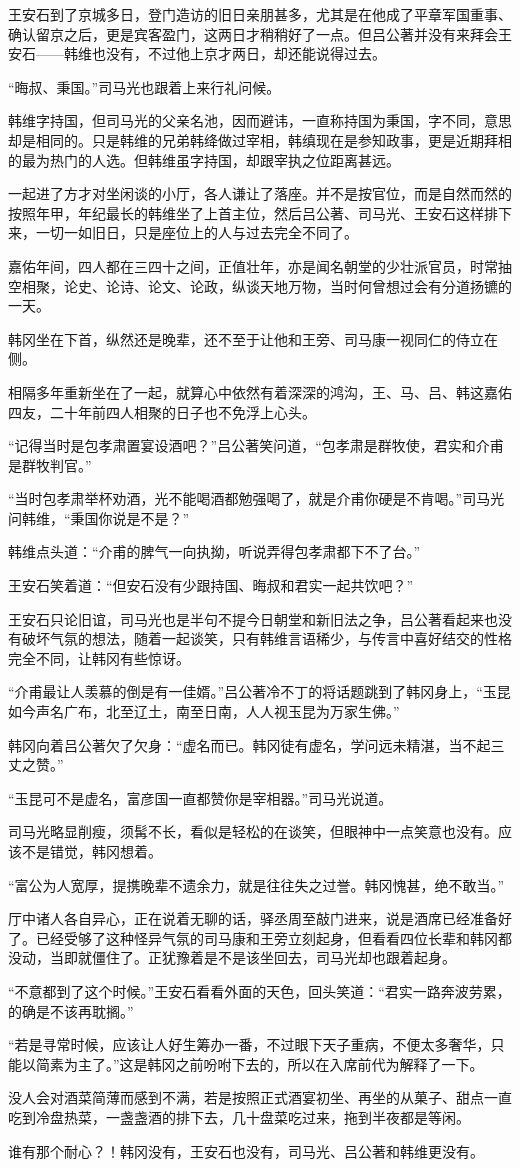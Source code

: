 王安石到了京城多日，登门造访的旧日亲朋甚多，尤其是在他成了平章军国重事、确认留京之后，更是宾客盈门，这两日才稍稍好了一点。但吕公著并没有来拜会王安石——韩维也没有，不过他上京才两日，却还能说得过去。

“晦叔、秉国。”司马光也跟着上来行礼问候。

韩维字持国，但司马光的父亲名池，因而避讳，一直称持国为秉国，字不同，意思却是相同的。只是韩维的兄弟韩绛做过宰相，韩缜现在是参知政事，更是近期拜相的最为热门的人选。但韩维虽字持国，却跟宰执之位距离甚远。

一起进了方才对坐闲谈的小厅，各人谦让了落座。并不是按官位，而是自然而然的按照年甲，年纪最长的韩维坐了上首主位，然后吕公著、司马光、王安石这样排下来，一切一如旧日，只是座位上的人与过去完全不同了。

嘉佑年间，四人都在三四十之间，正值壮年，亦是闻名朝堂的少壮派官员，时常抽空相聚，论史、论诗、论文、论政，纵谈天地万物，当时何曾想过会有分道扬镳的一天。

韩冈坐在下首，纵然还是晚辈，还不至于让他和王旁、司马康一视同仁的侍立在侧。

相隔多年重新坐在了一起，就算心中依然有着深深的鸿沟，王、马、吕、韩这嘉佑四友，二十年前四人相聚的日子也不免浮上心头。

“记得当时是包孝肃置宴设酒吧？”吕公著笑问道，“包孝肃是群牧使，君实和介甫是群牧判官。”

“当时包孝肃举杯劝酒，光不能喝酒都勉强喝了，就是介甫你硬是不肯喝。”司马光问韩维，“秉国你说是不是？”

韩维点头道：“介甫的脾气一向执拗，听说弄得包孝肃都下不了台。”

王安石笑着道：“但安石没有少跟持国、晦叔和君实一起共饮吧？”

王安石只论旧谊，司马光也是半句不提今日朝堂和新旧法之争，吕公著看起来也没有破坏气氛的想法，随着一起谈笑，只有韩维言语稀少，与传言中喜好结交的性格完全不同，让韩冈有些惊讶。

“介甫最让人羡慕的倒是有一佳婿。”吕公著冷不丁的将话题跳到了韩冈身上，“玉昆如今声名广布，北至辽土，南至日南，人人视玉昆为万家生佛。”

韩冈向着吕公著欠了欠身：“虚名而已。韩冈徒有虚名，学问远未精湛，当不起三丈之赞。”

“玉昆可不是虚名，富彦国一直都赞你是宰相器。”司马光说道。

司马光略显削瘦，须髯不长，看似是轻松的在谈笑，但眼神中一点笑意也没有。应该不是错觉，韩冈想着。

“富公为人宽厚，提携晚辈不遗余力，就是往往失之过誉。韩冈愧甚，绝不敢当。”

厅中诸人各自异心，正在说着无聊的话，驿丞周至敲门进来，说是酒席已经准备好了。已经受够了这种怪异气氛的司马康和王旁立刻起身，但看看四位长辈和韩冈都没动，当即就僵住了。正犹豫着是不是该坐回去，司马光却也跟着起身。

“不意都到了这个时候。”王安石看看外面的天色，回头笑道：“君实一路奔波劳累，的确是不该再耽搁。”

“若是寻常时候，应该让人好生筹办一番，不过眼下天子重病，不便太多奢华，只能以简素为主了。”这是韩冈之前吩咐下去的，所以在入席前代为解释了一下。

没人会对酒菜简薄而感到不满，若是按照正式酒宴初坐、再坐的从菓子、甜点一直吃到冷盘热菜，一盏盏酒的排下去，几十盘菜吃过来，拖到半夜都是等闲。

谁有那个耐心？！韩冈没有，王安石也没有，司马光、吕公著和韩维更没有。
